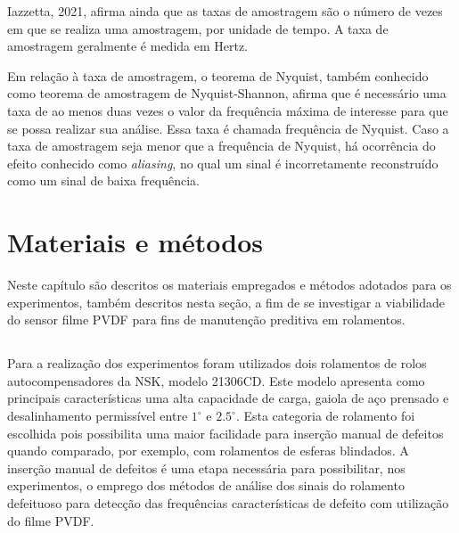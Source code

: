 \documentclass[
	12pt,				
	oneside,			
	a4paper,			
	english,			
	brazil,	
	sumario=abnt-6027-2012		
	]{abntex2ppgsi}
\begin{document}
Iazzetta, 2021, afirma ainda que as taxas de amostragem são o número de vezes em que se realiza uma amostragem, por unidade de tempo. A taxa de amostragem geralmente é medida em Hertz. 



Em relação à taxa de amostragem, o teorema de Nyquist, também conhecido como teorema de amostragem de Nyquist-Shannon, afirma que é necessário uma taxa de ao menos duas vezes o valor da frequência máxima de interesse para que se possa realizar sua análise. Essa taxa é chamada frequência de Nyquist. Caso a taxa de amostragem seja menor que a frequência de Nyquist, há ocorrência do efeito conhecido como \textit{aliasing}, no qual um sinal é incorretamente reconstruído como um sinal de baixa frequência.


\chapter{Materiais e métodos}
\label{secao:MateriaisEMetodos}

Neste capítulo são descritos os materiais empregados e métodos adotados para os experimentos, também descritos nesta seção, a fim de se investigar a viabilidade do sensor filme PVDF para fins de manutenção preditiva em rolamentos. 

\section{}

Para a realização dos experimentos foram utilizados dois rolamentos de rolos autocompensadores da NSK, modelo 21306CD. Este modelo apresenta como principais características uma alta capacidade de carga, gaiola de aço prensado e desalinhamento permissível entre $1^{\circ}$ e $2.5^{\circ}$. Esta categoria de rolamento foi escolhida pois possibilita uma maior facilidade para inserção manual de defeitos quando comparado, por exemplo, com rolamentos de esferas blindados. A inserção manual de defeitos é uma etapa necessária para possibilitar, nos experimentos, o emprego dos métodos de análise dos sinais do rolamento defeituoso para detecção das frequências características de defeito com utilização do filme PVDF. 
\end{document}
